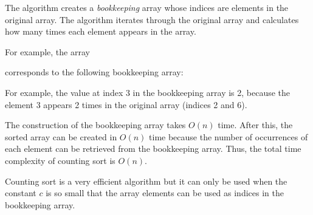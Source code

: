 The algorithm creates a \emph{bookkeeping} array
whose indices are elements in the original array.
The algorithm iterates through the original array
and calculates how many times each element
appears in the array.

For example, the array
\begin{center}
\end{center}
corresponds to the following bookkeeping array:
\begin{center}
\end{center}

For example, the value at index 3
in the bookkeeping array is 2,
because the element 3 appears 2 times
in the original array (indices 2 and 6).

The construction of the bookkeeping array
takes $O(n)$ time. After this, the sorted array
can be created in $O(n)$ time because
the number of occurrences of each element can be retrieved
from the bookkeeping array.
Thus, the total time complexity of counting
sort is $O(n)$.

Counting sort is a very efficient algorithm
but it can only be used when the constant $c$
is so small that the array elements can
be used as indices in the bookkeeping array.

